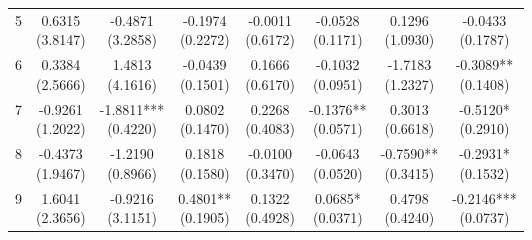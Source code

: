 \begin{table}[!htbp]
\begin{threeparttable}
\begin{subtable}[t]{\textwidth}
\begin{tabular}{@{}lccccccc@{}}
5 & \shortstack{0.6315\\(3.8147)} & \shortstack{-0.4871\\(3.2858)} & \shortstack{-0.1974\\(0.2272)} & \shortstack{-0.0011\\(0.6172)} & \shortstack{-0.0528\\(0.1171)} & \shortstack{0.1296\\(1.0930)} & \shortstack{-0.0433\\(0.1787)} \\
6 & \shortstack{0.3384\\(2.5666)} & \shortstack{1.4813\\(4.1616)} & \shortstack{-0.0439\\(0.1501)} & \shortstack{0.1666\\(0.6170)} & \shortstack{-0.1032\\(0.0951)} & \shortstack{-1.7183\\(1.2327)} & \shortstack{-0.3089**\\(0.1408)} \\
7 & \shortstack{-0.9261\\(1.2022)} & \shortstack{-1.8811***\\(0.4220)} & \shortstack{0.0802\\(0.1470)} & \shortstack{0.2268\\(0.4083)} & \shortstack{-0.1376**\\(0.0571)} & \shortstack{0.3013\\(0.6618)} & \shortstack{-0.5120*\\(0.2910)} \\
8 & \shortstack{-0.4373\\(1.9467)} & \shortstack{-1.2190\\(0.8966)} & \shortstack{0.1818\\(0.1580)} & \shortstack{-0.0100\\(0.3470)} & \shortstack{-0.0643\\(0.0520)} & \shortstack{-0.7590**\\(0.3415)} & \shortstack{-0.2931*\\(0.1532)} \\
9 & \shortstack{1.6041\\(2.3656)} & \shortstack{-0.9216\\(3.1151)} & \shortstack{0.4801**\\(0.1905)} & \shortstack{0.1322\\(0.4928)} & \shortstack{0.0685*\\(0.0371)} & \shortstack{0.4798\\(0.4240)} & \shortstack{-0.2146***\\(0.0737)} \\

\end{tabular}
\end{subtable}
\end{threeparttable}
\end{table}
